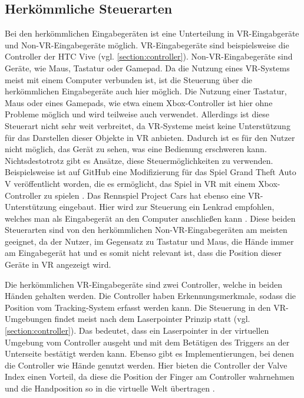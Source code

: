 \subsection{Herkömmliche Steuerarten}
Bei den herkömmlichen Eingabegeräten ist eine Unterteilung in \ac{VR}-Eingabgeräte und Non-\ac{VR}-Eingabegeräte möglich. \ac{VR}-Eingabegeräte sind beispielsweise die Controller der HTC Vive (vgl. \autoref{section:controller}). Non-\ac{VR}-Eingabegeräte sind Geräte, wie Maus, Tastatur oder Gamepad.
Da die Nutzung eines \ac{VR}-Systems meist mit einem Computer verbunden ist, ist die Steuerung über die herkömmlichen Eingabegeräte auch hier möglich. Die Nutzung einer Tastatur, Maus oder eines Gamepads, wie etwa einem Xbox-Controller ist hier ohne Probleme möglich und wird teilweise auch verwendet. Allerdings ist diese Steuerart nicht sehr weit verbreitet, da \ac{VR}-Systeme meist keine Unterstützung für das Darstellen dieser Objekte in \ac{VR} anbieten. Dadurch ist es für den Nutzer nicht möglich, das Gerät zu sehen, was eine Bedienung erschweren kann. Nichtsdestotrotz gibt es Ansätze, diese Steuermöglichkeiten zu verwenden. Beispielsweise ist auf GitHub eine Modifizierung für das Spiel Grand Theft Auto V veröffentlicht worden, die es ermöglicht, das Spiel in \ac{VR} mit einem Xbox-Controller zu spielen \cite{Werner.2020}. Das Rennspiel Project Cars hat ebenso eine \ac{VR}-Unterstützung eingebaut. Hier wird zur Steuerung ein Lenkrad empfohlen, welches man als Eingabegerät an den Computer anschließen kann \cite{projCars}. Diese beiden Steuerarten sind von den herkömmlichen Non-\ac{VR}-Eingabegeräten am meisten geeignet, da der Nutzer, im Gegensatz zu Tastatur und Maus, die Hände immer am Eingabegerät hat und es somit nicht relevant ist, dass die Position dieser Geräte in \ac{VR} angezeigt wird.

Die herkömmlichen \ac{VR}-Eingabegeräte sind zwei Controller, welche in beiden Händen gehalten werden. Die Controller haben Erkennungsmerkmale, sodass die Position vom Tracking-System erfasst werden kann. Die Steuerung in den \ac{VR}-Umgebungen findet meist nach dem Laserpointer Prinzip statt (vgl. \autoref{section:controller}). Das bedeutet, dass ein Laserpointer in der virtuellen Umgebung vom Controller ausgeht und mit dem Betätigen des Triggers an der Unterseite bestätigt werden kann. Ebenso gibt es Implementierungen, bei denen die Controller wie Hände genutzt werden. Hier bieten die Controller der Valve Index einen Vorteil, da diese die Position der Finger am Controller wahrnehmen und die Handposition so in die virtuelle Welt übertragen \cite{Index.Controller}.

